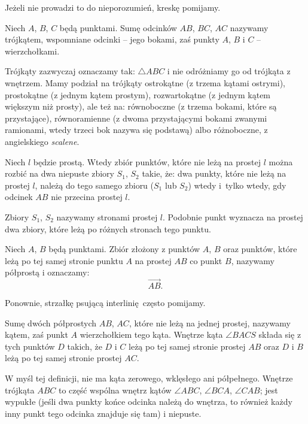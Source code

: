Jeżeli nie prowadzi to do nieporozumień, kreskę pomijamy.

\begin{definition}[trójkąt]
    Niech $A$, $B$, $C$ będą punktami.
    Sumę odcinków $AB$, $BC$, $AC$ nazywamy trójkątem, wspomniane odcinki -- jego bokami, zaś punkty $A$, $B$ i $C$ -- wierzchołkami.
%
\end{definition} %

Trójkąty zazwyczaj oznaczamy tak: $\triangle ABC$ i nie odróżniamy go od trójkąta z wnętrzem.
Mamy podział na trójkąty ostrokątne (z trzema kątami ostrymi), prostokątne (z jednym kątem prostym), rozwartokątne (z jednym kątem większym niż prosty), ale też na: równoboczne (z trzema bokami, które są przystające), równoramienne (z dwoma przystającymi bokami zwanymi ramionami, wtedy trzeci bok nazywa się podstawą) albo różnoboczne, z angielskiego \emph{scalene}.

\begin{proposition}
    Niech $l$ będzie prostą.
    Wtedy zbiór punktów, które nie leżą na prostej $l$ można rozbić na dwa niepuste zbiory $S_1$, $S_2$ takie, że: dwa punkty, które nie leżą na prostej $l$, należą do tego samego zbioru ($S_1$ lub $S_2$) wtedy i~tylko wtedy, gdy odcinek $AB$ nie przecina prostej $l$.
\end{proposition} %

Zbiory $S_1$, $S_2$ nazywamy stronami prostej $l$.
%
Podobnie punkt wyznacza na prostej dwa zbiory, które leżą po różnych stronach tego punktu.

\begin{definition}[półprosta]
    Niech $A$, $B$ będą punktami.
    Zbiór złożony z punktów $A$, $B$ oraz punktów, które leżą po tej samej stronie punktu $A$ na prostej $AB$ co punkt $B$, nazywamy półprostą i oznaczamy:
%
    \begin{equation}
        \overrightarrow{AB}.
    \end{equation}
\end{definition} %

Ponownie, strzałkę psującą interlinię często pomijamy.

\begin{definition}[kąt]
    Sumę dwóch półprostych $AB$, $AC$, które nie leżą na jednej prostej, nazywamy kątem, zaś punkt $A$ wierzchołkiem tego kąta.
    Wnętrze kąta $\angle BACS$ składa się z tych punktów $D$ takich, że $D$ i $C$ leżą po tej samej stronie prostej $AB$ oraz $D$ i $B$ leżą po tej samej stronie prostej $AC$. 
\end{definition} %

W myśl tej definicji, nie ma kąta zerowego, wklęsłego ani półpełnego.
%
%
%
Wnętrze trójkąta $ABC$ to część wspólna wnętrz kątów $\angle ABC$, $\angle BCA$, $\angle CAB$; jest wypukłe (jeśli dwa punkty końce odcinka należą do wnętrza, to również każdy inny punkt tego odcinka znajduje się tam) i niepuste.

%